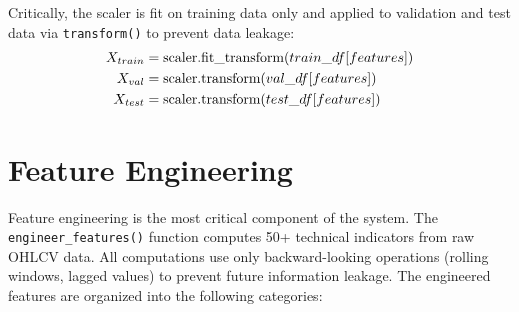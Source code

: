 \documentclass[12pt, a4paper]{report}
\begin{document}
	Critically, the scaler is fit on training data only and applied to validation and test data via \texttt{transform()} to prevent data leakage:
	\begin{align}
		X_{train} &= \text{scaler.fit\_transform}(train\_df[features]) \notag \\
		X_{val} &= \text{scaler.transform}(val\_df[features]) \notag \\
		X_{test} &= \text{scaler.transform}(test\_df[features]) \notag
	\end{align}
	
	\section{Feature Engineering}
	Feature engineering is the most critical component of the system. The \texttt{engineer\_features()} function computes 50+ technical indicators from raw OHLCV data. All computations use only backward-looking operations (rolling windows, lagged values) to prevent future information leakage. The engineered features are organized into the following categories:
	
\end{document}
